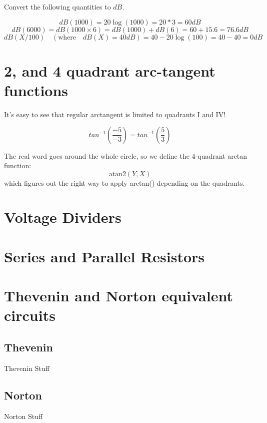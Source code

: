 \begin{ExampleSmall}
Convert the following quantities to $dB$.

\[
dB(1000) = 20\log(1000) = 20*3 = 60dB
\]
\[
dB(6000) = dB(1000\times6) = dB(1000) + dB(6)  = 60 + 15.6 = 76.6dB
\]
\[
dB(X/100) \quad (\mathrm{where }\quad dB(X)=40dB) = 40 - 20\log(100) = 40-40 = 0dB
\]

\end{ExampleSmall}

\section{2, and 4 quadrant arc-tangent functions}

It's easy to see that
regular arctangent is limited to quadrants I and IV!

\vspace{2.5in}
\[
tan^{-1}(\frac {-5}  {-3} ) = tan^{-1}(\frac {5}  {3} )
\]


The real word goes around the
whole circle, so we define the 4-quadrant arctan function:
\[
\mathrm{atan2}(Y,X)
\]
which figures out the right way to apply arctan() depending on the quadrants.


\section{Voltage Dividers}


\section{Series and Parallel Resistors}


\vspace{3.0in}
\section{Thevenin and Norton equivalent circuits}

\subsection{Thevenin}
\vspace{3.5in}
Thevenin Stuff

\subsection{Norton}
\vspace{3.5in}
Norton Stuff


